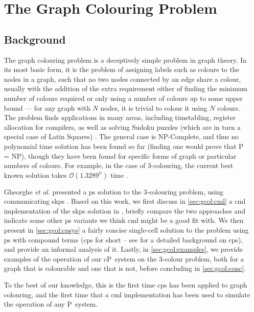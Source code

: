 \newcommand{\bo}{\(b\)}

\chapter{\label{chap:gcol}The Graph Colouring Problem}

\section{\label{sec:gcol:background}Background}

The graph colouring problem is a deceptively simple problem in graph theory.  In its most basic form, it is the problem of assigning labels such as colours to the nodes in a graph, such that no two nodes connected by an edge share a colour, usually with the addition of the extra requirement either of finding the minimum number of colours required or only using a number of colours up to some upper bound --- for any graph with \(N\) nodes, it is trivial to colour it using \(N\) colours.  The problem finds applications in many areas, including timetabling, register allocation for compilers, as well as solving Sudoku puzzles (which are in turn a special case of Latin Squares) \cite{Lewis2016}.  The general case is NP-Complete, and thus no polynomial time solution has been found so far (finding one would prove that P = NP), though they have been found for specific forms of graph or particular numbers of colours.  For example, in the case of 3-colouring, the current best known solution takes \(\mathcal{O}(1.3289^n)\) time \cite{Beigel2005}.

Gheorghe \textit{et al.} presented a \gls{ps} solution to the 3-colouring problem, using communicating \gls{skps} \cite{Gheorghe2013}.  Based on this work, we first discuss in \autoref{sec:gcol:cml} a \gls{cml} implementation of the \gls{skps} solution in \cite{Gheorghe2013}, briefly compare the two approaches and indicate some other \gls{ps} variants we think \gls{cml} might be a good fit with.  We then present in \autoref{sec:gcol:cpsys} a fairly concise single-cell solution to the problem using \gls{ps} with compound terms (\gls{cps} for short -- see \cite{Nicolescu2018} for a detailed background on \gls{cps}), and provide an informal analysis of it.  Lastly, in \autoref{sec:gcol:examples}, we provide examples of the operation of our cP~system on the 3-colour problem, both for a graph that is colourable and one that is not, before concluding in \autoref{sec:gcol:conc}.

To the best of our knowledge, this is the first time \gls{cps} has been applied to graph colouring, and the first time that a \gls{cml} implementation has been used to simulate the operation of any P~system.

